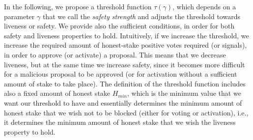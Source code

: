 %		

In the following, we propose a threshold function $\tau(\gamma)$, which depends 
on a 
parameter $\gamma$ that we call the \emph{safety strength} and adjusts the 
threshold towards liveness or safety. We provide also the 
sufficient conditions, in order for both safety and liveness properties to 
hold. Intuitively,   if we increase the threshold, we increase the required 
amount of honest-stake positive votes required (or signals), in order to 
approve (or activate) a proposal. This means that we decrease liveness, but at 
the same time we increase safety, since it becomes more difficult for a 
malicious proposal to be approved (or for activation without a sufficient 
amount of stake to take place). The definition of the threshold function 
includes also 
a fixed amount of honest stake $H_{min}$, which is the minimum value that we 
want our threshold to have and essentially determines the minimum amount of 
honest stake that we wish not to be blocked (either for voting or activation), 
i.e., it determines the minimum amount of honest stake that we wish the 
liveness property to hold.

